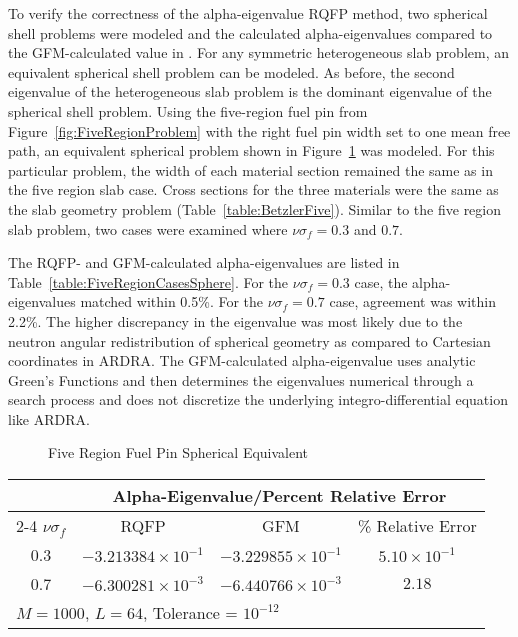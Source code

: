 To verify the correctness of the alpha-eigenvalue RQFP method, two spherical shell problems were modeled and the calculated alpha-eigenvalues compared to the GFM-calculated value in \cite{kornreich_greens_1997}. For any symmetric heterogeneous slab problem, an equivalent spherical shell problem can be modeled. As before, the second eigenvalue of the heterogeneous slab problem is the dominant eigenvalue of the spherical shell problem. Using the five-region fuel pin from Figure~\ref{fig:FiveRegionProblem} with the right fuel pin width set to one mean free path, an equivalent spherical problem shown in Figure~\ref{fig:FiveRegionSphereProblem} was modeled. For this particular problem, the width of each material section remained the same as in the five region slab case. Cross sections for the three materials were the same as the slab geometry problem (Table~\ref{table:BetzlerFive}). Similar to the five region slab problem, two cases were examined where $\nu \sigma_{f} = 0.3$ and $0.7$.

The RQFP- and GFM-calculated alpha-eigenvalues are listed in Table~\ref{table:FiveRegionCasesSphere}. For the $\nu \sigma_{f} = 0.3$ case, the alpha-eigenvalues matched within 0.5\%. For the $\nu \sigma_{f} = 0.7 $ case, agreement was within 2.2\%. The higher discrepancy in the eigenvalue was most likely due to the neutron angular redistribution of spherical geometry as compared to Cartesian coordinates in ARDRA. The GFM-calculated alpha-eigenvalue uses analytic Green's Functions and then determines the eigenvalues numerical through a search process and does not discretize the underlying integro-differential equation like ARDRA.

\begin{figure}[!htbp]
	\centering
	
	\caption{Five Region Fuel Pin Spherical Equivalent \cite{kornreich_timeeigenvalue_2005}}
	\label{fig:FiveRegionSphereProblem}
\end{figure}

\begin{table*}[!htbp]
\centering{}
\caption{Comparison of RQFP- and GFM-calculated alpha-eigenvalues for a three region multiplying sphere}
\label{table:FiveRegionCasesSphere}
\begin{tabular}{@{}cccc@{}}\toprule
& \multicolumn{3}{c}{Alpha-Eigenvalue/Percent Relative Error} \\
\cmidrule{2-4} $\nu \sigma_{f}$ & RQFP & GFM & \% Relative Error \\
\midrule
0.3 & $-3.213384 \times 10^{-1}$ & $-3.229855 \times 10^{-1}$ & $5.10 \times 10^{-1}$ \\ 
0.7 & $-6.300281 \times 10^{-3}$ & $-6.440766 \times 10^{-3}$ & $2.18$ \\ 
\bottomrule
\multicolumn{4}{l}{$M = 1000$, $L = 64$, Tolerance = $10^{-12}$} \\
\end{tabular}
\end{table*}

